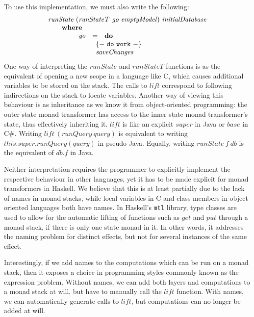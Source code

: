 To use this implementation, we must also write the following:
\begin{displaymath}
\begin{array}{l}
\mathit{runState}~(\mathit{runStateT}~\mathit{go}~\mathit{emptyModel})~\mathit{initialDatabase} \\
\qquad \mathbf{where} \\
\qquad \qquad \begin{array}{lcl}
\mathit{go} & = & \mathbf{do} \\
\multicolumn{3}{l}{\qquad \begin{array}{l}
\mathtt{\{-~do~work~-\}}\\
\mathit{saveChanges}
\end{array}} 
\end{array}
\end{array}
\end{displaymath}
One way of interpreting the $\mathit{runState}$ and $\mathit{runStateT}$ functions is as the equivalent of opening a new scope in a language like C, which causes additional variables to be stored on the stack. The calls to $\mathit{lift}$ correspond to following indirections on the stack to locate variables. Another way of viewing this behaviour is as inheritance as we know it from object-oriented programming: the outer state monad transformer has access to the inner state monad transformer's state, thus effectively inheriting it. $\mathit{lift}$ is like an explicit $\mathit{super}$ in Java or $\mathit{base}$ in C\#. Writing $\mathit{lift}~(\mathit{runQuery}~\mathit{query})$ is equivalent to writing $\mathit{this}.\mathit{super}.\mathit{runQuery}(\mathit{query})$ in pseudo Java. Equally, writing $\mathit{runState}~f~\mathit{db}$ is the equivalent of $\mathit{db}.\mathit{f}$ in Java.

Neither interpretation requires the programmer to explicitly implement the respective behaviour in other languages, yet it has to be made explicit for monad transformers in Haskell. We believe that this is at least partially due to the lack of names in monad stacks, while local variables in C and class members in object-oriented languages both have names. In Haskell's \texttt{mtl} library, type classes are used to allow for the automatic lifting of functions such as $\mathit{get}$ and $\mathit{put}$ through a monad stack, if there is only one state monad in it. In other words, it addresses the naming problem for distinct effects, but not for several instances of the same effect.

Interestingly, if we add names to the computations which can be run on a monad stack, then it exposes a choice in programming styles commonly known as the expression problem\cite{wadler1998expression}. Without names, we can add both layers and computations to a monad stack at will, but have to manually call the $\mathit{lift}$ function. With names, we can automatically generate calls to $\mathit{lift}$, but computations can no longer be added at will.

